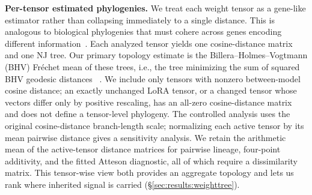 \documentclass{article}
\theoremstyle{definition}
\theoremstyle{plain}
\begin{document}
\textbf{Per-tensor estimated phylogenies.}
We treat each weight tensor as a gene-like estimator rather than collapsing immediately to a single
distance. This is analogous to biological phylogenies that must cohere across genes encoding different
information~\citep{maddison1997gene}. Each analyzed tensor yields one cosine-distance matrix and one
NJ tree. Our primary topology estimate is the Billera--Holmes--Vogtmann (BHV) Fr\'echet mean of these
trees, i.e., the tree minimizing the sum of squared BHV geodesic distances
~\citep{billera2001geometry, willis2019confidence}. We include only tensors with nonzero between-model
cosine distance; an exactly unchanged LoRA tensor, or a changed tensor whose vectors differ only by
positive rescaling, has an all-zero cosine-distance matrix and does not define a tensor-level phylogeny.
The controlled analysis uses the original cosine-distance
branch-length scale; normalizing each active tensor by its mean pairwise distance gives a sensitivity
analysis. We retain the arithmetic mean of the active-tensor distance matrices for pairwise lineage,
four-point additivity, and the fitted Atteson diagnostic, all of which require a dissimilarity matrix.
This tensor-wise view both provides an aggregate topology and lets us rank where inherited signal is
carried (\S\ref{sec:results:weighttree}).
\end{document}
